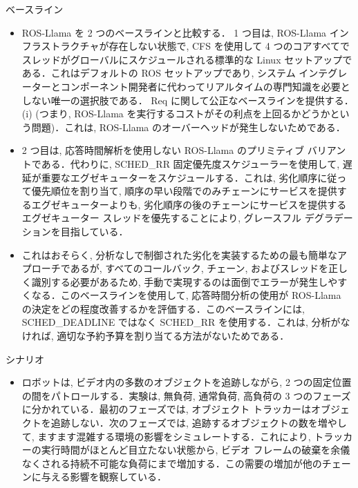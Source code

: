 \begin{frame}{ベースライン}
    \begin{itemize}
        \item ROS-Llama を 2 つのベースラインと比較する． 1 つ目は, ROS-Llama インフラストラクチャが存在しない状態で, CFS を使用して 4 つのコアすべてでスレッドがグローバルにスケジュールされる標準的な Linux セットアップである．これはデフォルトの ROS セットアップであり, システム インテグレーターとコンポーネント開発者に代わってリアルタイムの専門知識を必要としない唯一の選択肢である． Req に関して公正なベースラインを提供する． (i) (つまり, ROS-Llama を実行するコストがその利点を上回るかどうかという問題)．これは, ROS-Llama のオーバーヘッドが発生しないためである．
    \end{itemize}
\end{frame}

\begin{frame}{}
    \begin{itemize}
        \item 2 つ目は, 応答時間解析を使用しない ROS-Llama のプリミティブ バリアントである．代わりに, SCHED\_RR 固定優先度スケジューラーを使用して, 遅延が重要なエグゼキューターをスケジュールする．これは, 劣化順序に従って優先順位を割り当て, 順序の早い段階でのみチェーンにサービスを提供するエグゼキューターよりも, 劣化順序の後のチェーンにサービスを提供するエグゼキューター スレッドを優先することにより, グレースフル デグラデーションを目指している．
    \end{itemize}
\end{frame}

\begin{frame}{}
    \begin{itemize}
        \item これはおそらく, 分析なしで制御された劣化を実装するための最も簡単なアプローチであるが, すべてのコールバック, チェーン, およびスレッドを正しく識別する必要があるため, 手動で実現するのは面倒でエラーが発生しやすくなる．このベースラインを使用して, 応答時間分析の使用が ROS-Llama の決定をどの程度改善するかを評価する．このベースラインには, SCHED\_DEADLINE ではなく SCHED\_RR を使用する．これは, 分析がなければ, 適切な予約予算を割り当てる方法がないためである．
    \end{itemize}
\end{frame}

\begin{frame}{シナリオ}
    \begin{itemize}
        \item ロボットは, ビデオ内の多数のオブジェクトを追跡しながら, 2 つの固定位置の間をパトロールする．実験は, 無負荷, 通常負荷, 高負荷の 3 つのフェーズに分かれている．最初のフェーズでは, オブジェクト トラッカーはオブジェクトを追跡しない．次のフェーズでは, 追跡するオブジェクトの数を増やして, ますます混雑する環境の影響をシミュレートする．これにより, トラッカーの実行時間がほとんど目立たない状態から, ビデオ フレームの破棄を余儀なくされる持続不可能な負荷にまで増加する．この需要の増加が他のチェーンに与える影響を観察している．
    \end{itemize}
\end{frame}


